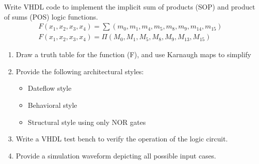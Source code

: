 \documentclass{article}
\begin{document}
\begin{Q}
    {
        Write VHDL code to implement the implicit sum of products (SOP) and product of sums
        (POS) logic functions.
        \begin{align*}
            F(x_1,x_2,x_3,x_4)=\sum (m_0,m_1,m_4,m_5,m_8,m_9,m_{14},m_{15}) \\
            F(x_1,x_2,x_3,x_4)= \Pi (M_0,M_1,M_5,M_8,M_9,M_{13},M_{15})
        \end{align*}
        \begin{enumerate}
            \item Draw a truth table for the function (F), and use Karnaugh maps to simplify
            \item   Provide the following architectural styles:
                  \begin{itemize}
                      \item Dateflow style
                      \item  Behavioral style
                      \item  Structural style using only NOR gates
                  \end{itemize}
            \item  Write a VHDL test bench to verify the operation of the logic circuit.
            \item Provide a simulation waveform depicting all possible input cases.
        \end{enumerate}
    }
\end{Q}

\end{document}
